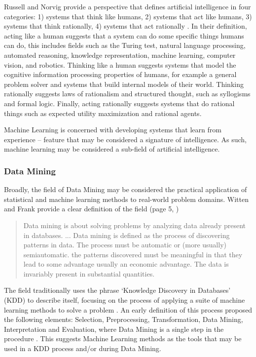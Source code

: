 Russell and Norvig provide a perspective that defines artificial intelligence in four categories: 1) systems that think like humans, 2) systems that act like humans, 3) systems that think rationally, 4) systems that act rationally \cite{Russell2009}. In their definition, acting like a human suggests that a system can do some specific things humans can do, this includes fields such as the Turing test, natural language processing, automated reasoning, knowledge representation, machine learning, computer vision, and robotics. Thinking like a human suggests systems that model the cognitive information processing properties of humans, for example a general problem solver and systems that build internal models of their world. Thinking rationally suggests laws of rationalism and structured thought, such as syllogisms and formal logic. Finally, acting rationally suggests systems that do rational things such as expected utility maximization and rational agents. 

Machine Learning is concerned with developing systems that learn from experience -- feature that may be considered a signature of intelligence. As such, machine learning may be considered a sub-field of artificial intelligence.

\subsubsection{Data Mining}
Broadly, the field of Data Mining may be considered the practical application of statistical and machine learning methods to real-world problem domains. 
Witten and Frank provide a clear definition of the field (page 5, \cite{Witten2000})

\begin{quotation}
Data mining is about solving problems by analyzing data already present in databases. ... Data mining is defined as the process of discovering patterns in data. The process must be automatic or (more usually) semiautomatic. the patterns discovered must be meaningful in that they lead to some advantage usually an economic advantage. The data is invariably present in substantial quantities.
\end{quotation}

The field traditionally uses the phrase `Knowledge Discovery in Databases' (KDD) to describe itself, focusing on the process of applying a suite of machine learning methods to solve a problem \cite{Frawley1992}. An early definition of this process proposed the following elements: Selection, Preprocessing, Transformation, Data Mining, Interpretation and Evaluation, where Data Mining is a single step in the procedure \cite{Fayyad1996a}.
This suggests Machine Learning methods as the tools that may be used in a KDD process and/or during Data Mining.

